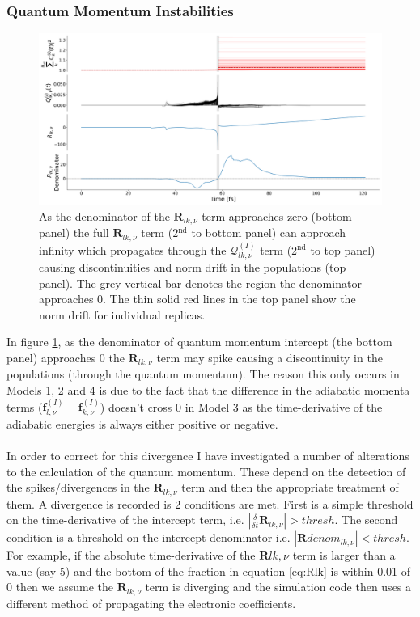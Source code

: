 \subsubsection{Quantum Momentum Instabilities}
\label{sect:QlkSpikes}
\begin{figure}[ht]
	\includegraphics[width=\textwidth]{../img/CTMQC/TullyModels/Spikes/RlkDenom_Rlk_Qlk_Norm.png}
	\caption{\label{fig:QlkSpike}As the denominator of the $\mathbf{R}_{lk,\nu}$ term approaches zero (bottom panel) the full $\mathbf{R}_{lk, \nu}$ term (2$^{\text{nd}}$ to bottom panel) can approach infinity which propagates through the $\mathcal{Q}_{lk, \nu}^{(I)}$ term (2$^{\text{nd}}$ to top panel) causing discontinuities and norm drift in the populations (top panel). The grey vertical bar denotes the region the denominator approaches 0. The thin solid red lines in the top panel show the norm drift for individual replicas.}
\end{figure}
\noindent In figure \ref{fig:QlkSpike}, as the denominator of quantum momentum intercept (the bottom panel) approaches 0 the $\mathbf{R}_{lk, \nu}$ term may spike causing a discontinuity in the populations (through the quantum momentum). The reason this only occurs in Models 1, 2 and 4 is due to the fact that the difference in the adiabatic momenta terms ($\mathbf{f}_{l, \nu}^{(I)} - \mathbf{f}_{k, \nu}^{(I)}$) doesn't cross 0 in Model 3 as the time-derivative of the adiabatic energies is always either positive or negative. 
\\\\
In order to correct for this divergence I have investigated a number of alterations to the calculation of the quantum momentum. These depend on the detection of the spikes/divergences in the $\mathbf{R}_{lk, \nu}$ term and then the appropriate treatment of them. A divergence is recorded is 2 conditions are met. First is a simple threshold on the time-derivative of the intercept term, i.e. $|\frac{\delta}{\delta t} \mathbf{R}_{lk, \nu}| > thresh$. The second condition is a threshold on the intercept denominator i.e. $|\mathbf{R}denom_{lk, \nu}| < thresh$. For example, if the absolute time-derivative of the $\mathbf{R}{lk, \nu}$ term is larger than a value (say 5) and the bottom of the fraction in equation \eqref{eq:Rlk} is within 0.01 of 0 then we assume the $\mathbf{R}_{lk, \nu}$ term is diverging and the simulation code then uses a different method of propagating the electronic coefficients.
